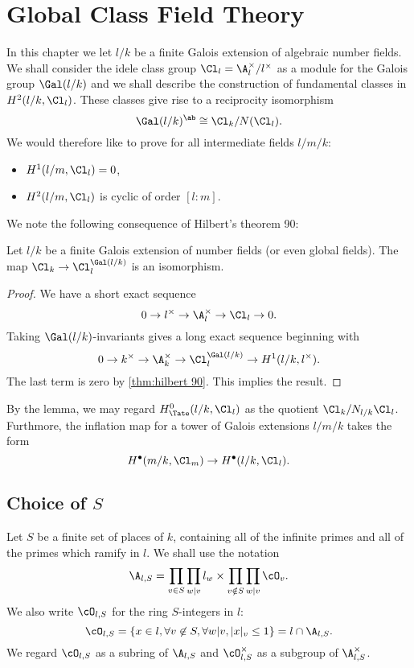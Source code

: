 \chapter{Global Class Field Theory}

In this chapter we let $l/k$ be a finite Galois extension of
algebraic number fields. We shall consider the idele class group $\Cl_l = \A_l^\times / l^\times$
as a module for the Galois group $\Gal(l/k)$ and we shall describe the construction of
fundamental classes in $H^2(l/k, \Cl_l)$.
These classes give rise to a reciprocity isomorphism
\[
	\Gal(l/k)^{\ab} \cong \Cl_k / N(\Cl_l).
\]
We would therefore like to prove for all intermediate fields $l / m / k$:
\begin{itemize}
	\item
	$H^1(l/m, \Cl_l) = 0$,
	\item
	$H^2(l/m, \Cl_l)$ is cyclic of order $[l:m]$.
\end{itemize}

We note the following consequence of Hilbert's theorem 90:

\begin{lemma} \label{lem:idele class invariants}
	Let $l/k$ be a finite Galois extension of number fields (or even global fields).
	The map $\Cl_k \to \Cl_l ^ {\Gal(l/k)}$ is an isomorphism.
\end{lemma}

\begin{proof}
	We have a short exact sequence
	\[
		0 \to l^\times \to \A_l^\times \to \Cl_l \to 0.
	\]
	Taking $\Gal(l/k)$-invariants gives a long exact sequence beginning with
	\[
		0 \to k^\times \to \A_k^\times \to \Cl_l^{\Gal(l/k)} \to H^1(l/k, l^\times).
	\]
	The last term is zero by \ref{thm:hilbert 90}. This implies the result.
\end{proof}

By the lemma, we may regard $H^0_{\Tate}(l/k,\Cl_l)$ as the quotient
$\Cl_k / N_{l/k} \Cl_l$.
Furthmore, the inflation map for a tower of Galois extensions $l/m/k$ takes the form
\[
	H^\bullet(m/k, \Cl_m) \to H^\bullet(l/k, \Cl_l).
\]







\section{Choice of $S$}

Let $S$ be a finite set of places of $k$, containing all of the infinite primes and all
of the primes which ramify in $l$.
We shall use the notation
\[
	\A_{l,S} = \prod_{v \in S} \prod_{w | v} l_w \times \prod_{v \notin S} \prod_{w | v} \cO_v.
\]
We also write $\cO_{l,S}$ for the ring $S$-integers in $l$:
\[
	\cO_{l,S} = \{x \in l, \forall v \not\in S, \forall w | v, |x|_v \le 1\} = l \cap \A_{l,S}.
\]
We regard $\cO_{l,S}$ as a subring of $\A_{l,S}$ and
$\cO_{l,S}^\times$ as a subgroup of $\A_{l,S}^\times$.

